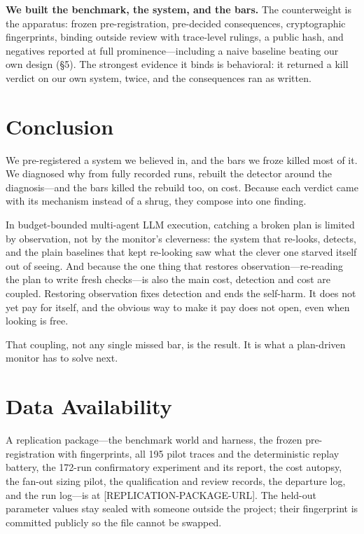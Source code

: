 \documentclass[acmsmall,screen]{acmart}
\begin{document}
\textbf{We built the benchmark, the system, and the bars.} The counterweight is
the apparatus: frozen pre-registration, pre-decided consequences, cryptographic
fingerprints, binding outside review with trace-level rulings, a public hash,
and negatives reported at full prominence---including a naive baseline beating
our own design (\S5). The strongest evidence it binds is behavioral: it returned
a kill verdict on our own system, twice, and the consequences ran as written.

\section{Conclusion}
We pre-registered a system we believed in, and the bars we froze killed most of
it. We diagnosed why from fully recorded runs, rebuilt the detector around the
diagnosis---and the bars killed the rebuild too, on cost. Because each verdict
came with its mechanism instead of a shrug, they compose into one finding.

In budget-bounded multi-agent LLM execution, catching a broken plan is limited
by observation, not by the monitor's cleverness: the system that re-looks,
detects, and the plain baselines that kept re-looking saw what the clever one
starved itself out of seeing. And because the one thing that restores
observation---re-reading the plan to write fresh checks---is also the main cost,
detection and cost are coupled. Restoring observation fixes detection and ends
the self-harm. It does not yet pay for itself, and the obvious way to make it
pay does not open, even when looking is free.

That coupling, not any single missed bar, is the result. It is what a
plan-driven monitor has to solve next.

\section*{Data Availability}
A replication package---the benchmark world and harness, the frozen
pre-registration with fingerprints, all 195 pilot traces and the deterministic
replay battery, the 172-run confirmatory experiment and its report, the cost
autopsy, the fan-out sizing pilot, the qualification and review records, the
departure log, and the run log---is at [REPLICATION-PACKAGE-URL]. The held-out
parameter values stay sealed with someone outside the project; their fingerprint
is committed publicly so the file cannot be swapped.

\appendix
\end{document}
